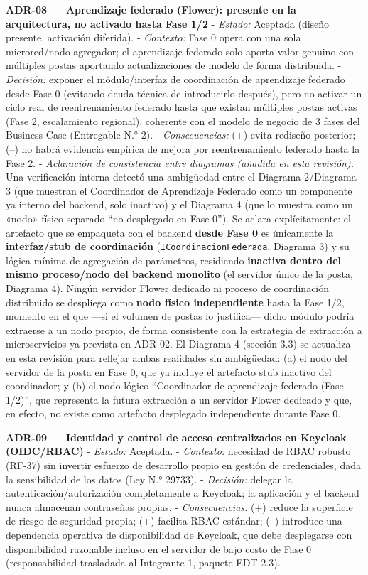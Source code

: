\documentclass[11pt,a4paper]{article}
\begin{document}
\textbf{ADR-08 --- Aprendizaje federado (Flower): presente en la arquitectura, no activado hasta Fase 1/2}
- \emph{Estado:} Aceptada (diseño presente, activación diferida).
- \emph{Contexto:} Fase 0 opera con una sola microred/nodo agregador; el aprendizaje federado solo aporta valor genuino con múltiples postas aportando actualizaciones de modelo de forma distribuida.
- \emph{Decisión:} exponer el módulo/interfaz de coordinación de aprendizaje federado desde Fase 0 (evitando deuda técnica de introducirlo después), pero no activar un ciclo real de reentrenamiento federado hasta que existan múltiples postas activas (Fase 2, escalamiento regional), coherente con el modelo de negocio de 3 fases del Business Case (Entregable N.° 2).
- \emph{Consecuencias:} (+) evita rediseño posterior; (--) no habrá evidencia empírica de mejora por reentrenamiento federado hasta la Fase 2.
- \emph{Aclaración de consistencia entre diagramas (añadida en esta revisión).} Una verificación interna detectó una ambigüedad entre el Diagrama 2/Diagrama 3 (que muestran el Coordinador de Aprendizaje Federado como un componente ya interno del backend, solo inactivo) y el Diagrama 4 (que lo muestra como un «nodo» físico separado ``no desplegado en Fase 0''). Se aclara explícitamente: el artefacto que se empaqueta con el backend \textbf{desde Fase 0} es únicamente la \textbf{interfaz/stub de coordinación} (\texttt{ICoordinacionFederada}, Diagrama 3) y su lógica mínima de agregación de parámetros, residiendo \textbf{inactiva dentro del mismo proceso/nodo del backend monolito} (el servidor único de la posta, Diagrama 4). Ningún servidor Flower dedicado ni proceso de coordinación distribuido se despliega como \textbf{nodo físico independiente} hasta la Fase 1/2, momento en el que ---si el volumen de postas lo justifica--- dicho módulo podría extraerse a un nodo propio, de forma consistente con la estrategia de extracción a microservicios ya prevista en ADR-02. El Diagrama 4 (sección 3.3) se actualiza en esta revisión para reflejar ambas realidades sin ambigüedad: (a) el nodo del servidor de la posta en Fase 0, que ya incluye el artefacto stub inactivo del coordinador; y (b) el nodo lógico ``Coordinador de aprendizaje federado (Fase 1/2)'', que representa la futura extracción a un servidor Flower dedicado y que, en efecto, no existe como artefacto desplegado independiente durante Fase 0.

\textbf{ADR-09 --- Identidad y control de acceso centralizados en Keycloak (OIDC/RBAC)}
- \emph{Estado:} Aceptada.
- \emph{Contexto:} necesidad de RBAC robusto (RF-37) sin invertir esfuerzo de desarrollo propio en gestión de credenciales, dada la sensibilidad de los datos (Ley N.° 29733).
- \emph{Decisión:} delegar la autenticación/autorización completamente a Keycloak; la aplicación y el backend nunca almacenan contraseñas propias.
- \emph{Consecuencias:} (+) reduce la superficie de riesgo de seguridad propia; (+) facilita RBAC estándar; (--) introduce una dependencia operativa de disponibilidad de Keycloak, que debe desplegarse con disponibilidad razonable incluso en el servidor de bajo costo de Fase 0 (responsabilidad trasladada al Integrante 1, paquete EDT 2.3).
\end{document}
